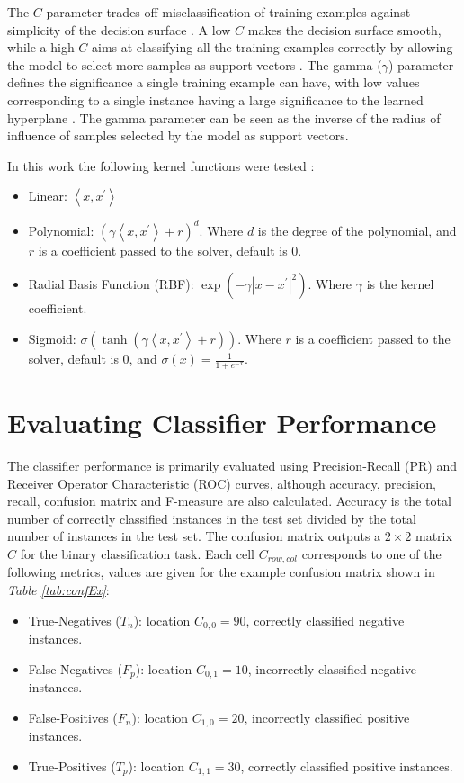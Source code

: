 \documentclass[ms]{nuthesis}
\begin{document}
The $C$ parameter trades off misclassification of training examples against simplicity of the
decision surface \cite{scikit-learn}. A low $C$ makes the decision surface smooth, while a high $C$ aims at
classifying all the training examples correctly by allowing the model to select more samples as support
vectors \cite{scikit-learn}. The gamma ($\gamma$) parameter defines the significance a single training example
 can have, with low values corresponding to a single instance having a large significance to the
 learned hyperplane \cite{scikit-learn}. The gamma parameter can be seen as the inverse of the radius of
 influence of samples selected by the model as support vectors.

In this work the following kernel functions were tested \cite{scikit-learn}:
\begin{itemize}
  \item Linear: $\left \langle x,x^{'} \right \rangle$
  \item Polynomial: $(\gamma \left \langle x,x^{'} \right \rangle + r)^{d}$. Where $d$ is the degree
  of the polynomial, and $r$ is a coefficient passed to the solver, default is $0$.
  \item Radial Basis Function (RBF): $\exp(-\gamma |x-x^{'}|^{2})$. Where $\gamma$ is the kernel coefficient.
  \item Sigmoid: $\sigma(\tanh(\gamma \left \langle x,x^{'} \right \rangle + r))$.
  Where $r$ is a coefficient passed to the solver, default is $0$, and $\sigma(x)=\frac{1}{1+e^{-x}}$.
\end{itemize}


\section{Evaluating Classifier Performance}
\label{sect:PerformanceMetrics}
\par The classifier performance is primarily evaluated using Precision-Recall (PR) and Receiver Operator
Characteristic (ROC) curves, although accuracy, precision, recall, confusion matrix and  F-measure
are also calculated. Accuracy is the total number of correctly classified instances in the test set
divided by the total number of instances in the test set. The confusion matrix outputs a $2 \times 2$ matrix $C$
for the binary classification task. Each cell $C_{row,col}$
corresponds to one of the following metrics, values are given for the example confusion
matrix shown in \textit{Table \ref{tab:confEx}}:
\begin{itemize}
  \item True-Negatives ($T_n$): location $C_{0,0} = 90$, correctly classified negative instances.
  \item False-Negatives ($F_p$): location $C_{0,1} = 10$, incorrectly classified negative instances.
  \item False-Positives ($F_n$): location $C_{1,0} = 20$, incorrectly classified positive instances.
  \item True-Positives ($T_p$): location $C_{1,1} = 30$, correctly classified positive instances.
\end{itemize}
\end{document}
